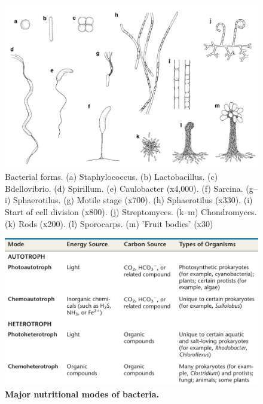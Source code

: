 \documentclass[ignorenonframetext,aspectratio=169]{beamer}
\begin{document}
\begin{frame}{}
\protect\hypertarget{section-3}{}

\begin{figure}
\includegraphics[width=0.55\linewidth]{./../images/bacteria} \caption{Bacterial forms. (a) Staphylococcus. (b) Lactobacillus. (c) Bdellovibrio. (d) Spirillum. (e) Caulobacter (x4,000). (f) Sarcina. (g–i) Sphaerotilus. (g) Motile stage (x700). (h) Sphaerotilus (x330). (i) Start of cell division (x800). (j) Streptomyces. (k–m) Chondromyces. (k) Rods (x200). (l) Sporocarps. (m) 'Fruit bodies' (x30)}\label{fig:bacteria}
\end{figure}

\end{frame}

\begin{frame}{}
\protect\hypertarget{section-4}{}

\begin{figure}
\includegraphics[width=0.55\linewidth]{./../images/nutritional_modes_bacteria} \caption{\textbf{Major nutritional modes of bacteria.}}\label{fig:bacterial-nutrition-modes}
\end{figure}

\end{frame}
\end{document}
